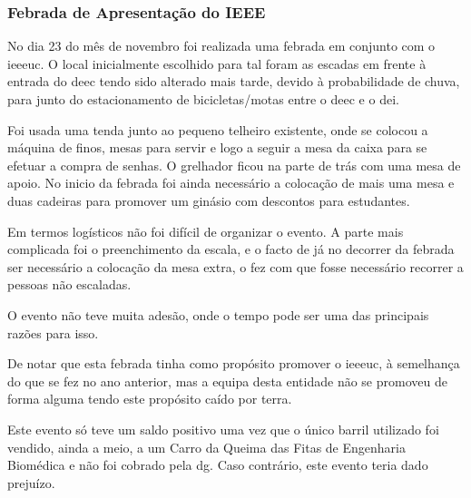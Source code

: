 
\subsubsection{Febrada de Apresentação do IEEE}

No dia 23 do mês de novembro foi realizada uma febrada em conjunto com o \acrfull{ieeeuc}. O local inicialmente escolhido para tal foram as escadas em frente à entrada do \acrshort{deec} tendo sido alterado mais tarde, devido à probabilidade de chuva, para junto do estacionamento de bicicletas/motas entre o \acrshort{deec} e o \acrshort{dei}.

Foi usada uma tenda junto ao pequeno telheiro existente, onde se colocou a máquina de finos, mesas para servir e logo a seguir a mesa da caixa para se efetuar a compra de senhas. O grelhador ficou na parte de trás com uma mesa de apoio.
No inicio da febrada foi ainda necessário a colocação de mais uma mesa e duas cadeiras para promover um ginásio com descontos para estudantes.

Em termos logísticos não foi difícil de organizar o evento. A parte mais complicada foi o preenchimento da escala, e o facto de já no decorrer da febrada ser necessário a colocação da mesa extra, o fez com que fosse necessário recorrer a pessoas não escaladas. 

O evento não teve muita adesão, onde o tempo pode ser uma das principais razões para isso.

De notar que esta febrada tinha como propósito promover o \acrshort{ieeeuc}, à semelhança do que se fez no ano anterior, mas a equipa desta entidade não se promoveu de forma alguma tendo este propósito caído por terra.

{ %
	Este evento só teve um saldo positivo uma vez que o único barril utilizado foi vendido, ainda a meio, a um Carro da Queima das Fitas de Engenharia Biomédica e não foi cobrado pela \acrshort{dg}. Caso contrário, este evento teria dado prejuízo.
}
{ %
}

